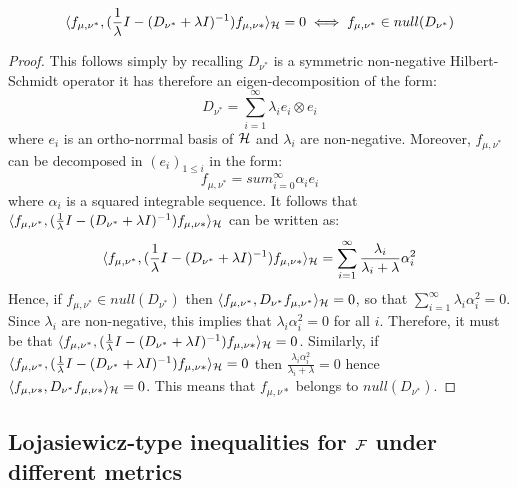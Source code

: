 \begin{proposition}\label{prop:null_space_diff_operator}
	 \[\langle f_{\mu,\nu^{*}}, (\frac{1}{\lambda}I - (D_{\nu^{*}} +\lambda I )^{-1})f_{\mu,\nu{*}} \rangle_{{{\mathcal H}}} = 0 \iff f_{\mu,\nu^{*}} \in null(D_{\nu^{*}})
	 \]
\end{proposition}
\begin{proof}
	This follows simply by recalling $D_{\nu^{*}}$ is a symmetric non-negative Hilbert-Schmidt operator it has therefore an eigen-decomposition of the form:
	\[
	D_{\nu^{*}}  = \sum_{i=1}^{\infty} \lambda_i e_i \otimes e_i
 	\]
 	where $e_i$ is an ortho-norrmal basis of ${{\mathcal H}}$ and $\lambda_i$ are non-negative. Moreover, $f_{\mu,\nu^{*}}$ can be decomposed in $(e_i)_{1\leq i}$ in the form:
 	\[
 	f_{\mu,\nu^{*}} = sum_{i=0}^{\infty} \alpha_i e_i
 	\]
 	where $\alpha_i$ is a squared integrable sequence. It follows that $\langle f_{\mu,\nu^{*}}, (\frac{1}{\lambda}I - (D_{\nu^{*}} +\lambda I )^{-1})f_{\mu,\nu{*}} \rangle_{{{\mathcal H}}}$ can be written as:
 	\[
 	\langle f_{\mu,\nu^{*}}, (\frac{1}{\lambda}I - (D_{\nu^{*}} +\lambda I )^{-1})f_{\mu,\nu{*}} \rangle_{{{\mathcal H}}} = \sum_{i=1}^{\infty} \frac{\lambda_i}{\lambda_i+\lambda} \alpha_i^2
 	\]
 	Hence, if $f_{\mu,\nu^{*}}\in null(D_{\nu^{*}})$ then $\langle f_{\mu,\nu^{*}}, D_{\nu^{*}}f_{\mu,\nu^{*}}\rangle_{{{\mathcal H}}}= 0$, so that $\sum_{i=1}^{\infty} \lambda_i \alpha_i^2 = 0$. Since $\lambda_i$ are non-negative, this implies that $\lambda_i \alpha_i^2= 0$ for all $i$. Therefore, it must be that $\langle f_{\mu,\nu^{*}}, (\frac{1}{\lambda}I - (D_{\nu^{*}} +\lambda I )^{-1})f_{\mu,\nu{*}} \rangle_{{{\mathcal H}}}  = 0$.
 	Similarly, if $\langle f_{\mu,\nu^{*}}, (\frac{1}{\lambda}I - (D_{\nu^{*}} +\lambda I )^{-1})f_{\mu,\nu{*}} \rangle_{{{\mathcal H}}}  =0 $ then $\frac{\lambda_i\alpha_i^2}{\lambda_i + \lambda} = 0$ hence $\langle f_{\mu,\nu{*}}, D_{\nu^{*}} f_{\mu,\nu{*}} \rangle_{{{\mathcal H}}} = 0$. This means that $f_{\mu,\nu{*}}$ belongs to $null(D_{\nu^*})$.
\end{proof}


\subsection{Lojasiewicz-type inequalities for ${{\mathcal F}}$ under different metrics}\label{subsec:Lojasiewicz_different_metrics}

